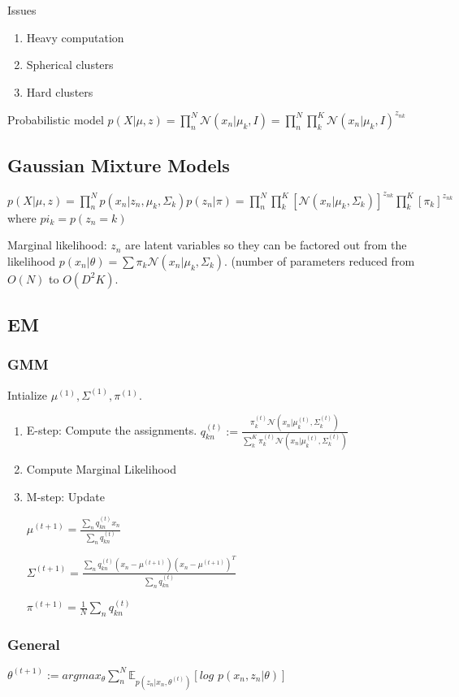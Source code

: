 Issues
\begin{enumerate}
	\item Heavy computation
	\item Spherical clusters
	\item Hard clusters
\end{enumerate}

Probabilistic model
$p(X|\mu,z) = \prod_n^N \mathcal{N}(x_n|\mu_k,I) = \prod_n^N \prod_k^K \mathcal{N}(x_n|\mu_k,I)^{z_{nk}}$ 

\subsection{Gaussian Mixture Models}
$p(X|\mu,z) = \prod_n^N p(x_n|z_n,\mu_k,\Sigma_k)p(z_n|\pi) 
= \prod_n^N \prod_k^K [\mathcal{N}(x_n|\mu_k,\Sigma_k)]^{z_{nk}} \prod_k^K [\pi_k]^{z_{nk}}$ where $pi_k = p(z_n=k)$

Marginal likelihood: $z_n$ are latent variables so they can be factored out from the likelihood $p(x_n|\theta) = \sum \pi_k \mathcal{N}(x_n|\mu_k, \Sigma_k)$. (number of parameters reduced from $O(N)$ to $O(D^2K)$.

\subsection{EM}
\subsubsection{GMM}
Intialize $\mu^{(1)}, \Sigma^{(1)}, \pi^{(1)}$.
\begin{enumerate}
\item E-step: Compute the assignments. $q_{kn}^{(t)} := \frac{\pi_k^{(t)} \mathcal{N}(x_n|\mu_k^{(t)}, \Sigma_k^{(t)})}{ \sum_k^K \pi_k^{(t)} \mathcal{N}(x_n|\mu_k^{(t)}, \Sigma_k^{(t)}) }$
\item Compute Marginal Likelihood
\item M-step: Update 

$\mu^{(t+1)} = \frac{\sum_n q_{kn}^{(t)} x_n}{\sum_n q_{kn}^{(t)}}$

$\Sigma^{(t+1)} = \frac{\sum_n q_{kn}^{(t)}(x_n - \mu^{(t+1)})(x_n - \mu^{(t+1)})^T}{\sum_n q_{kn}^{(t)}}$

$\pi^{(t+1)} = \frac{1}{N} \sum_n q_{kn}^{(t)}$
\end{enumerate}

\subsubsection{General}
$\theta^{(t+1)} := argmax_{\theta} \sum_n^N \mathbb{E}_{p(z_n|x_n,\theta^{(t)})}[log\,\, p(x_n,z_n|\theta)]$


